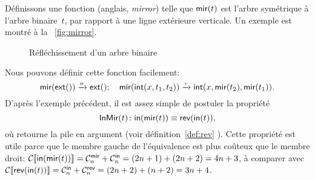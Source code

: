 Définissons une fonction  (anglais,
\emph{mirror}) telle que \(\fun{mir}(t)\) est l'arbre symétrique à
l'arbre binaire~\(t\), par rapport à une ligne extérieure
verticale. Un exemple est montré à la \fig~\vref{fig:mirror}.
\begin{figure}[b]
\centering
\subfloat[\(t\)]{\texttt{[image: bt\_ex2]}}
\qquad
{}
\caption{Réfléchissement d'un arbre binaire\label{fig:mirror}}
\end{figure}
Nous pouvons définir cette fonction facilement:
\begin{equation*}
\fun{mir}(\fun{ext}()) \xrightarrow{\smash{\sigma}} \fun{ext}();
\quad
\fun{mir}(\fun{int}(x,t_1,t_2)) \xrightarrow{\smash{\tau}}
\fun{int}(x,\fun{mir}(t_2),\fun{mir}(t_1)).
\end{equation*}
D'après l'exemple précédent, il est assez simple de postuler la
propriété
\begin{equation*}
\pred{InMir}{t} \colon \fun{in}(\fun{mir}(t)) \equiv
\fun{rev}(\fun{in}(t)),\index{InMir@\predName{InMir}}
\end{equation*}
où 
retourne la pile en argument (voir
définition~\eqref{def:rev} ). Cette propriété est
utile parce que le membre gauche de l'équivalence est plus coûteux que
le membre droit: \(\Call{\fun{in}(\fun{mir}(t))} = \C{\fun{mir}}{n} +
\C{\fun{in}}{n} = (2n+1) + (2n+2) = 4n + 3\), à comparer avec
\(\Call{\fun{rev}(\fun{in}(t))} = \C{\fun{in}}{n} + \C{\fun{rev}}{n} =
(2n+2) + (n+2) = 3n + 4\).

